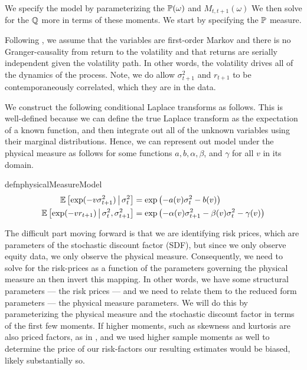 \documentclass[11pt, letterpaper, twoside, final]{article}
\begin{document}
We specify the model by parameterizing the $\mathbb{P}(\omega)$ and $M_{t, t+1}(\omega)$
We then solve for the $\mathbb{Q}$ more in terms of these moments.
We start by specifying the $\mathbb{P}$ measure.

Following \textcite{khrapov2016affine}, we assume that the variables are first-order Markov and there is no
Granger-causality from return to the volatility and that returns are serially independent given the volatility
path.
In other words, the volatility drives all of the dynamics of the process.
Note, we do allow $\sigma^2_{t+1}$ and $r_{t+1}$ to be contemporaneously correlated, which they are in the data. 

We construct the following conditional Laplace transforms as follows.
This is well-defined because we can define the true Laplace transform as the expectation of a known function,
and then integrate out all of the unknown variables using their marginal distributions.
Hence, we can represent out model under the physical measure as follows for some functions $a, b,
\alpha, \beta$, and $\gamma$ for all $v$ in its domain.


\begin{restatable}{defn}{physicalMeasureModel}
    \label{defn:physical_model}
    \begin{align}
        \operatorname{\mathbb{E}} \left[\exp(-v \sigma^2_{t+1}) \,\middle\vert\, \sigma^2_t \right] &= \exp\left( - a(v) 
        \sigma^2_t - b(v) \right) \\
        \operatorname{\mathbb{E}}\left[\exp(-v r_{t+1}) \,\middle\vert\, \sigma^2_t,  \sigma^2_{t+1}\right] &= \exp\left(- \alpha(v)
        \sigma^2_{t+1} - \beta(v)\sigma^2_t - \gamma(v) \right) 
    \end{align}
\end{restatable}


The difficult part moving forward is that we are identifying risk prices, which are  parameters of the stochastic
discount factor (SDF), but since we only observe equity data, we only observe the physical measure.
Consequently, we need to solve for the risk-prices as a function of the parameters governing the physical measure
an then invert this mapping.
In other words, we have some structural parameters --- the risk prices --- and we need to relate them to the
reduced form parameters --- the physical measure parameters.
We will do this by parameterizing the physical measure and the stochastic discount factor in terms of the first
few moments.
If higher moments, such as skewness and kurtosis are also priced factors, as in \textcites{harvey2000conditional,
conrad2012exante, chang2013market},  and we used higher sample moments as well to determine the price of our
risk-factors our resulting estimates would be biased, likely substantially so. 
\end{document}
